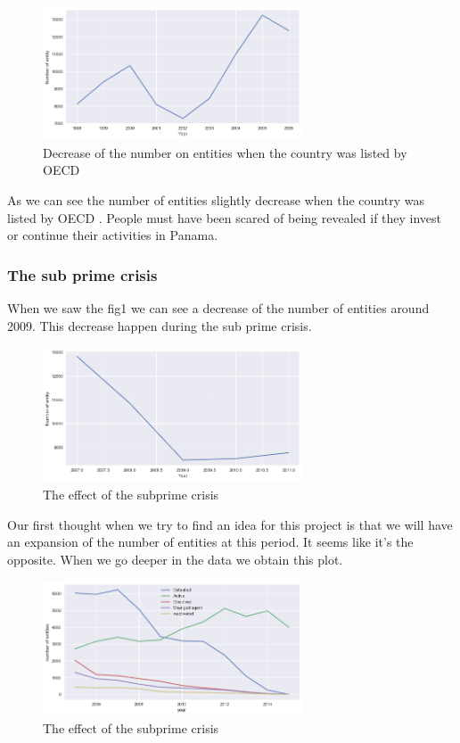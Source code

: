 \documentclass[11pt]{article}
\begin{document}
\begin{figure}[h]
	\centering
    \includegraphics[width=7.7cm,height=4cm]{00-05}
    \caption{Decrease of the number on entities when the country was listed by OECD}
    \label{fig:d}
\end{figure}

As we can see the number of entities slightly decrease when the country was listed by OECD \cite{OECD_report}. People must have been scared of being revealed if they invest or continue their activities in Panama. 

\subsubsection{The sub prime crisis}
When we saw the fig1 we can see a decrease of the number of entities around 2009. This decrease happen during the sub prime crisis.

\begin{figure}[h]
	\centering
    \includegraphics[width=7.7cm,height=4cm]{subprime}
    \caption{The effect of the subprime crisis}
    \label{fig:e}
\end{figure}

Our first thought when we try to find an idea for this project is that we will have an expansion of the number of entities at this period. It seems like it's the opposite. When we go deeper in the data we obtain this plot.

\begin{figure}[h]
	\centering
    \includegraphics[width=7.7cm,height=4cm]{subprime2}
    \caption{The effect of the subprime crisis}
    \label{fig:f}
\end{figure}
\end{document}
